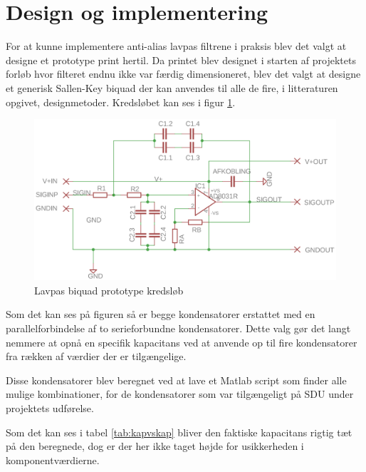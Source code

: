 \section{Design og implementering}\label{sec:filter_design}
For at kunne implementere anti-alias lavpas filtrene i praksis blev det valgt at designe et 
prototype print hertil. Da printet blev designet i starten af projektets forløb hvor filteret 
endnu ikke var færdig dimensioneret, blev det valgt at designe et generisk Sallen-Key biquad 
der kan anvendes til alle de fire, i litteraturen opgivet, designmetoder. Kredsløbet kan ses i 
figur \ref{fig:skbiquadsch}.



\begin{figure}[H]
	\centering
	\includegraphics[width=.7\linewidth]{billeder/skbiquadsch}
	\caption{Lavpas biquad prototype kredsløb}
	\label{fig:skbiquadsch}
\end{figure}

Som det kan ses på figuren så er begge kondensatorer erstattet med en parallelforbindelse af 
to serieforbundne kondensatorer. Dette valg gør det langt nemmere at opnå en specifik 
kapacitans ved at anvende op til fire kondensatorer fra rækken af værdier der er tilgængelige.

Disse kondensatorer blev beregnet ved at lave et Matlab script som finder alle mulige kombinationer, for de kondensatorer som var tilgængeligt på SDU under projektets udførelse.

Som det kan ses i tabel \ref{tab:kapvskap} bliver den faktiske kapacitans rigtig tæt på den
beregnede, dog er der her ikke taget højde for usikkerheden i komponentværdierne.

